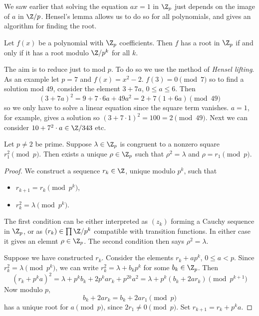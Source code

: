 \documentclass[a4paper]{article}
\begin{document}
We saw earlier that solving the equation \(ax = 1\) in \(\Z_p\) just depends on the image of \(a\) in \(\Z/p\). Hensel's lemma allows us to do so for all polynomials, and gives an algorithm for finding the root.

\begin{lemma}
  Let \(f(x)\) be a polynomial with \(\Z_p\) coefficients. Then \(f\) has a root in \(\Z_p\) if and only if it has a root modulo \(\Z/p^k\) for all \(k\).
\end{lemma}

The aim is to reduce just to mod \(p\). To do so we use the method of \emph{Hensel lifting}. As an example let \(p = 7\) and \(f(x) = x^2 - 2\). \(f(3) = 0 \pmod 7\) so to find a solution mod \(49\), consider the element \(3 + 7a\), \(0 \leq a \leq 6\). Then
\[
  (3 + 7a)^2 = 9 + 7 \cdot 6a + 49 a^2 = 2 + 7 (1 + 6a) \pmod{49}
\]
so we only have to solve a linear equation since the square term vanishes. \(a = 1\), for example, gives a solution so \((3 + 7 \cdot 1)^2 = 100 = 2 \pmod{49}\). Next we can consider \(10 + 7^2 \cdot a \in \Z/343\) etc.

\begin{proposition}
  Let \(p \ne 2\) be prime. Suppose \(\lambda \in \Z_p\) is congruent to a nonzero square \(r_1^2 \pmod p\). Then exists a unique \(\rho \in \Z_p\) such that \(\rho^2 = \lambda\) and \(\rho = r_1 \pmod p\).
\end{proposition}

\begin{proof}
  We construct a sequence \(r_k \in \Z\), unique modulo \(p^k\), such that
  \begin{itemize}
  \item \(r_{k + 1} = r_k \pmod{p^k}\),
  \item \(r_k^2 = \lambda \pmod{p^k}\).
  \end{itemize}
  The first condition can be either interpreted as \((z_k)\) forming a Cauchy sequence in \(\Z_p\), or as \((r_k) \in \prod \Z/p^k\) compatible with transition functions. In either case it gives an elemnt \(\rho \in \Z_p\). The second condition then says \(\rho^2 = \lambda\).

  Suppose we have constructed \(r_k\). Consider the elements \(r_k + ap^k\), \(0 \leq a < p\). Since \(r_k^2 = \lambda \pmod{p^k}\), we can write \(r_k^2 = \lambda + b_k p^k\) for some \(b_k \in \Z_p\). Then
  \[
    (r_k + p^ka)^2 = \lambda + p^kb_k + 2p^ka r_k + p^{2k} a^2
    = \lambda + p^k(b_k + 2a r_k) \pmod{p^{k + 1}}
  \]
  Now modulo \(p\),
  \[
    b_k + 2ar_k = b_k + 2ar_1 \pmod p
  \]
  has a unique root for \(a \pmod p\), since \(2r_1 \ne 0 \pmod p\). Set \(r_{k + 1} = r_k + p^k a\).
\end{proof}
\end{document}
